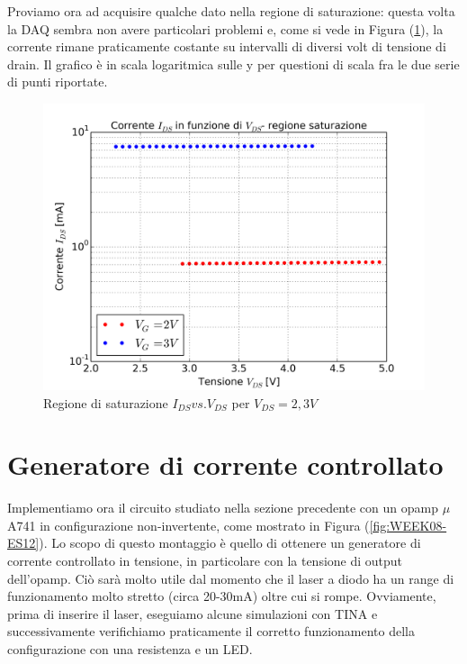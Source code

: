 \documentclass[journal, a4paper]{IEEEtran}
\begin{document}
Proviamo ora ad acquisire qualche dato nella regione di saturazione: questa volta la DAQ sembra non avere particolari problemi e, come si vede in Figura (\ref{fig:es11_multivg}), la corrente rimane praticamente costante su intervalli di diversi volt di tensione di drain. Il grafico è in scala logaritmica sulle y per questioni di scala fra le due serie di punti riportate. \\

\begin{figure}
\centering
\includegraphics[width=0.9\linewidth]{./es11_multivg}
\caption{Regione di saturazione $I_{DS} vs. V_{DS}$ per $V_{DS} = 2, 3 V$}
\label{fig:es11_multivg}
\end{figure}

\section{Generatore di corrente controllato}

Implementiamo ora il circuito studiato nella sezione precedente con un opamp $\mu $A741 in configurazione non-invertente, come mostrato in Figura (\ref{fig:WEEK08-ES12}). Lo scopo di questo montaggio è quello di ottenere un generatore di corrente controllato in tensione, in particolare con la tensione di output dell'opamp. Ciò sarà molto utile dal momento che il laser a diodo ha un range di funzionamento molto stretto (circa 20-30mA) oltre cui si rompe. Ovviamente, prima di inserire il laser, eseguiamo alcune simulazioni con TINA e successivamente verifichiamo praticamente il corretto funzionamento della configurazione con una resistenza e un LED.\\
\end{document}

